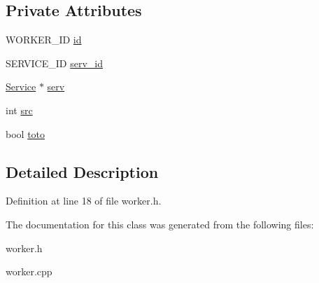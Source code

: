 \subsection*{Private Attributes}
\begin{CompactItemize}
\item 
\hypertarget{classWorker_b5ffcb995e12fa71b9551e91729d6972}{
WORKER\_\-ID \hyperlink{classWorker_b5ffcb995e12fa71b9551e91729d6972}{id}}
\label{classWorker_b5ffcb995e12fa71b9551e91729d6972}

\item 
\hypertarget{classWorker_d7dc76e301fd2bcf5d3a2088a59f1378}{
SERVICE\_\-ID \hyperlink{classWorker_d7dc76e301fd2bcf5d3a2088a59f1378}{serv\_\-id}}
\label{classWorker_d7dc76e301fd2bcf5d3a2088a59f1378}

\item 
\hypertarget{classWorker_454e1764ed165af733cc44a73e395692}{
\hyperlink{classService}{Service} $\ast$ \hyperlink{classWorker_454e1764ed165af733cc44a73e395692}{serv}}
\label{classWorker_454e1764ed165af733cc44a73e395692}

\item 
\hypertarget{classWorker_895c3ebc198018ea3391c09bc802d2f6}{
int \hyperlink{classWorker_895c3ebc198018ea3391c09bc802d2f6}{src}}
\label{classWorker_895c3ebc198018ea3391c09bc802d2f6}

\item 
\hypertarget{classWorker_7ba5a18b2918cf9e704536b763be37f7}{
bool \hyperlink{classWorker_7ba5a18b2918cf9e704536b763be37f7}{toto}}
\label{classWorker_7ba5a18b2918cf9e704536b763be37f7}

\end{CompactItemize}


\subsection{Detailed Description}




Definition at line 18 of file worker.h.

The documentation for this class was generated from the following files:\begin{CompactItemize}
\item 
worker.h\item 
worker.cpp\end{CompactItemize}
